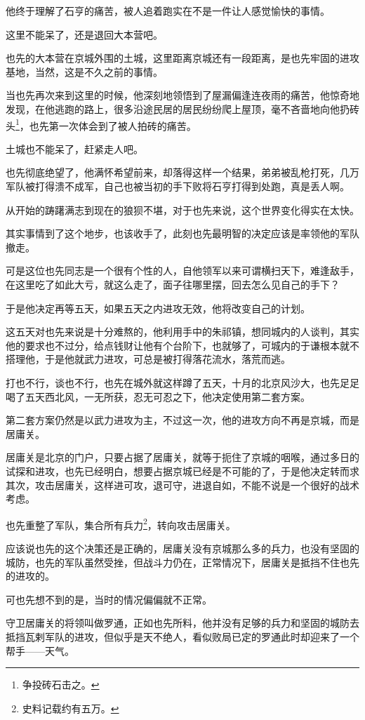 \begin{multicols}{\theparacolNo}
他终于理解了石亨的痛苦，被人追着跑实在不是一件让人感觉愉快的事情。

这里不能呆了，还是退回大本营吧。

也先的大本营在京城外围的土城，这里距离京城还有一段距离，是也先牢固的进攻基地，当然，这是不久之前的事情。

当也先再次来到这里的时候，他深刻地领悟到了屋漏偏逢连夜雨的痛苦，他惊奇地发现，在他逃跑的路上，很多沿途民居的居民纷纷爬上屋顶，毫不吝啬地向他扔砖头\footnote{争投砖石击之。}，也先第一次体会到了被人拍砖的痛苦。

土城也不能呆了，赶紧走人吧。

也先彻底绝望了，他满怀希望前来，却落得这样一个结果，弟弟被乱枪打死，几万军队被打得溃不成军，自己也被当初的手下败将石亨打得到处跑，真是丢人啊。

从开始的踌躇满志到现在的狼狈不堪，对于也先来说，这个世界变化得实在太快。

其实事情到了这个地步，也该收手了，此刻也先最明智的决定应该是率领他的军队撤走。

可是这位也先同志是一个很有个性的人，自他领军以来可谓横扫天下，难逢敌手，在这里吃了如此大亏，就这么走了，面子往哪里摆，回去怎么见自己的手下？

于是他决定再等五天，如果五天之内进攻无效，他将改变自己的计划。

这五天对也先来说是十分难熬的，他利用手中的朱祁镇，想同城内的人谈判，其实他的要求也不过分，给点钱财让他有个台阶下，也就够了，可城内的于谦根本就不搭理他，于是他就武力进攻，可总是被打得落花流水，落荒而逃。

打也不行，谈也不行，也先在城外就这样蹲了五天，十月的北京风沙大，也先足足喝了五天西北风，一无所获，忍无可忍之下，他决定使用第二套方案。

第二套方案仍然是以武力进攻为主，不过这一次，他的进攻方向不再是京城，而是居庸关。

居庸关是北京的门户，只要占据了居庸关，就等于扼住了京城的咽喉，通过多日的试探和进攻，也先已经明白，想要占据京城已经是不可能的了，于是他决定转而求其次，攻击居庸关，这样进可攻，退可守，进退自如，不能不说是一个很好的战术考虑。

也先重整了军队，集合所有兵力\footnote{史料记载约有五万。}，转向攻击居庸关。

应该说也先的这个决策还是正确的，居庸关没有京城那么多的兵力，也没有坚固的城防，也先的军队虽然受挫，但战斗力仍在，正常情况下，居庸关是抵挡不住也先的进攻的。

可也先想不到的是，当时的情况偏偏就不正常。

守卫居庸关的将领叫做罗通，正如也先所料，他并没有足够的兵力和坚固的城防去抵挡瓦剌军队的进攻，但似乎是天不绝人，看似败局已定的罗通此时却迎来了一个帮手——天气。


\end{multicols}
